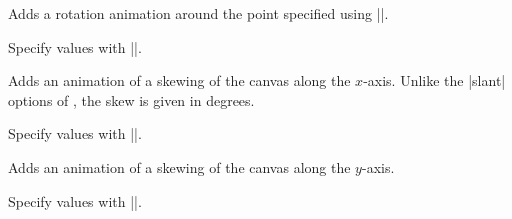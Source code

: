 \begin{command}{\pgfsys@animaterotate}
  Adds a rotation animation around the point specified using
  |\pgfsys@animation@origin|. 
  
  Specify values with |\pgfsys@animation@scalar|.
\begin{codeexample}[width=2cm]
\end{codeexample}
\begin{codeexample}[width=2cm]
\end{codeexample}
\end{command}

\begin{command}{\pgfsys@animateskewx}
  Adds an animation of a skewing of the canvas along the
  $x$-axis. Unlike the |slant| options of \tikzname, the skew is given
  in degrees.
  
  Specify values with |\pgfsys@animation@scalar|.
\begin{codeexample}[width=2cm]
\end{codeexample}
\end{command}

\begin{command}{\pgfsys@animateskewy}
  Adds an animation of a skewing of the canvas along the $y$-axis.
  
  Specify values with |\pgfsys@animation@scalar|.
\end{command}

